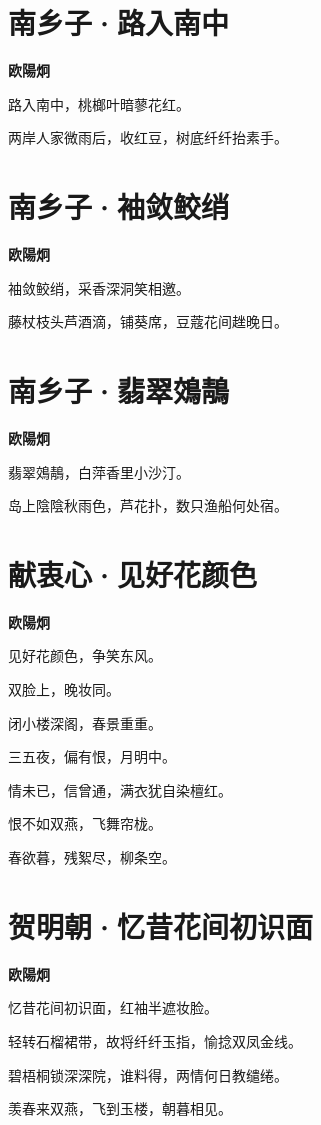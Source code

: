 \documentclass[12pt,a4paper]{ctexbook}
\begin{document}
\section{南乡子·路入南中}
\textbf{欧陽炯}\par\vspace{0.5em}
路入南中，桃榔叶暗蓼花红。\par
两岸人家微雨后，收红豆，树底纤纤抬素手。\par

\section{南乡子·袖敛鲛绡}
\textbf{欧陽炯}\par\vspace{0.5em}
袖敛鲛绡，采香深洞笑相邀。\par
藤杖枝头芦酒滴，铺葵席，豆蔻花间趖晚日。\par

\section{南乡子·翡翠鵁鶄}
\textbf{欧陽炯}\par\vspace{0.5em}
翡翠鵁鶄，白萍香里小沙汀。\par
岛上陰陰秋雨色，芦花扑，数只渔船何处宿。\par

\section{献衷心·见好花颜色}
\textbf{欧陽炯}\par\vspace{0.5em}
见好花颜色，争笑东风。\par
双脸上，晚妆同。\par
闭小楼深阁，春景重重。\par
三五夜，偏有恨，月明中。\par
情未已，信曾通，满衣犹自染檀红。\par
恨不如双燕，飞舞帘栊。\par
春欲暮，残絮尽，柳条空。\par

\section{贺明朝·忆昔花间初识面}
\textbf{欧陽炯}\par\vspace{0.5em}
忆昔花间初识面，红袖半遮妆脸。\par
轻转石榴裙带，故将纤纤玉指，愉捻双凤金线。\par
碧梧桐锁深深院，谁料得，两情何日教缱绻。\par
羡春来双燕，飞到玉楼，朝暮相见。\par
\end{document}
